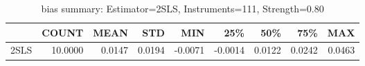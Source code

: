 \begin{table}[ht]
\centering
\caption{bias summary: Estimator=2SLS, Instruments=111, Strength=0.80}
\begin{tabular}{lrrrrrrrr}
\toprule
 & COUNT & MEAN & STD & MIN & 25\% & 50\% & 75\% & MAX \\
\midrule
2SLS & 10.0000 & 0.0147 & 0.0194 & -0.0071 & -0.0014 & 0.0122 & 0.0242 & 0.0463 \\
\bottomrule
\end{tabular}
\end{table}
